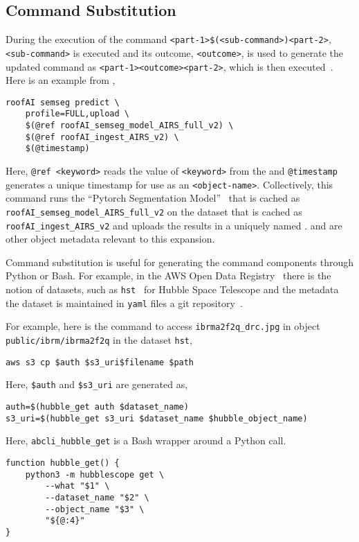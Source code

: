 \subsection{Command Substitution}\label{command_substitution}

During the execution of the command \texttt{<part-1>\$(<sub-command>)<part-2>}, \texttt{<sub-command>} is executed and its outcome, \texttt{<outcome>}, is used to generate the updated command as \texttt{<part-1><outcome><part-2>}, which is then executed~. Here is an example from ,
%
\begin{verbatim}
roofAI semseg predict \
    profile=FULL,upload \
    $(@ref roofAI_semseg_model_AIRS_full_v2) \
    $(@ref roofAI_ingest_AIRS_v2) \
    $(@timestamp)
\end{verbatim}
%
Here, \texttt{@ref <keyword>} reads the value of \texttt{<keyword>} from the  and \texttt{@timestamp} generates a unique timestamp for use as an \texttt{<object-name>}. Collectively, this command runs the \enquote{Pytorch Segmentation Model}~ that is cached as \texttt{roofAI\_semseg\_model\_AIRS\_full\_v2} on the dataset that is cached as \texttt{roofAI\_ingest\_AIRS\_v2} and uploads the results in a uniquely named .  and  are other object metadata relevant to this expansion.

Command substitution is useful for generating the command components through Python or Bash. For example, in the AWS Open Data Registry~ there is the notion of datasets, such as \texttt{hst}~ for Hubble Space Telescope and the metadata the dataset is maintained in \texttt{yaml} files a git repository~. 

For example, here is the command to access \texttt{ibrma2f2q\_drc.jpg} in object \texttt{public/ibrm/ibrma2f2q} in the dataset \texttt{hst},
%
\begin{verbatim}
aws s3 cp $auth $s3_uri$filename $path
\end{verbatim}
%
Here, \texttt{\$auth} and \texttt{\$s3\_uri} are generated as,
%
\begin{verbatim}
auth=$(hubble_get auth $dataset_name)
s3_uri=$(hubble_get s3_uri $dataset_name $hubble_object_name)
\end{verbatim}
%
Here, \texttt{abcli\_hubble\_get} is a Bash wrapper around a Python call.
%
\begin{verbatim}
function hubble_get() {
    python3 -m hubblescope get \
        --what "$1" \
        --dataset_name "$2" \
        --object_name "$3" \
        "${@:4}"
}
\end{verbatim}




